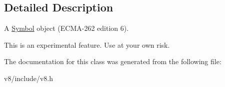\subsection{Detailed Description}
A \hyperlink{classv8_1_1Symbol}{Symbol} object (E\+C\+M\+A-\/262 edition 6).

This is an experimental feature. Use at your own risk. 

The documentation for this class was generated from the following file\+:\begin{DoxyCompactItemize}
\item 
v8/include/v8.\+h\end{DoxyCompactItemize}
